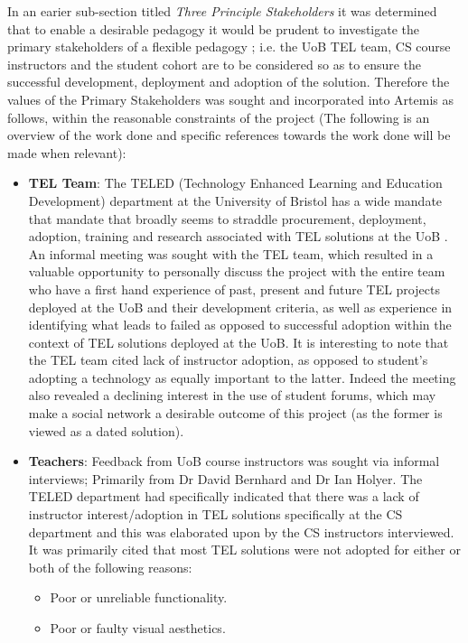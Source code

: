 In an earier sub-section titled  \textit{Three Principle Stakeholders} it was determined that to enable a desirable pedagogy it would be prudent to investigate the primary stakeholders of a flexible pedagogy \cite{Gordon2014}; i.e. the UoB TEL team, CS course instructors and the student cohort are to be considered so as to ensure the successful development, deployment and adoption of the solution. Therefore the values of the Primary Stakeholders was sought and incorporated into Artemis as follows, within the reasonable constraints of the project (The following is an overview of the work done and specific references towards the work done will be made when relevant):

\begin{itemize}
    \item \textbf{TEL Team}: The TELED (Technology Enhanced Learning and Education Development)  department at the University of Bristol has a wide mandate that mandate that broadly seems to straddle procurement, deployment, adoption, training and research associated with TEL solutions at the UoB \cite{UniversityofBristol}. An informal meeting was sought with the TEL team, which resulted in a valuable opportunity to personally discuss the project with the entire team who have a first hand experience of past, present and future TEL projects deployed at the UoB and their development criteria, as well as experience in identifying what leads to failed as opposed to successful adoption within the context of TEL solutions deployed at the UoB. It is interesting to note that the TEL team cited lack of instructor adoption, as opposed to student's adopting a technology as equally important to the latter. Indeed the meeting also revealed a declining interest in the use of student forums, which may make a social network a desirable outcome of this project (as the former is viewed as a dated solution).
    
    \item \textbf{Teachers}: Feedback from UoB course instructors was sought via informal interviews; Primarily from Dr David Bernhard and Dr Ian Holyer. The TELED department had specifically indicated that there was a lack of instructor interest/adoption in TEL solutions specifically at the CS department and this was elaborated upon by the CS instructors interviewed. It was primarily cited that most TEL solutions were not adopted for either or both of the following reasons:
    
    \begin{itemize}
        \item Poor or unreliable functionality.
        \item Poor or faulty visual aesthetics.
    \end{itemize}
    

\end{itemize}
